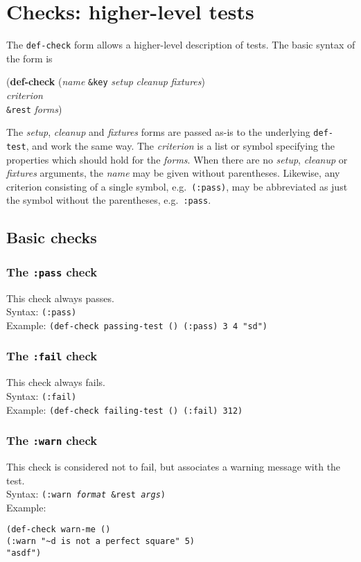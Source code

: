 \documentclass{article}
\begin{document}
\section{Checks: higher-level tests}
The
\texttt{def-check}
form allows a higher-level description of tests.  The basic syntax of
the form is
\begin{tabbing}\hspace*{1cm}
(\textbf{de}\=\textbf{f-}\=\textbf{check} (\textit{name}
	\texttt{\&key} \= \textit{setup}
	     \textit{cleanup} \textit{fixtures})
\\ \>\> \textit{criterion}
\\ \>\texttt{\&rest} \textit{forms})
\end{tabbing}
The \textit{setup}, \textit{cleanup} and \textit{fixtures} forms are
passed as-is to the underlying \texttt{def-test}, and work the same
way.  The \textit{criterion} is a list or symbol specifying the
properties which should hold for the \textit{forms}.  When there are
no \textit{setup}, \textit{cleanup} or \textit{fixtures} arguments,
the \textit{name} may be given without parentheses.  Likewise, any
criterion consisting of a single symbol, e.g.\ \texttt{(:pass)}, may
be abbreviated as just the symbol without the parentheses, e.g.\
\texttt{:pass}.
\subsection{Basic checks}
\subsubsection{The \texttt{:pass} check} 
This check always passes.
\\ Syntax: \texttt{(:pass)}
\\ Example: \texttt{(def-check passing-test () (:pass) 3 4 "sd")}

\subsubsection{The \texttt{:fail} check} 
This check always fails.
\\ Syntax: \texttt{(:fail)}
\\ Example: \texttt{(def-check failing-test () (:fail) 312)}

\subsubsection{The \texttt{:warn} check} 
This check is considered not to fail, but associates a warning message
with the test.\index{warn@\texttt{:warn}}
\\ Syntax: \texttt{(:warn \emph{format} \&rest \emph{args})}
\\ Example:
\begin{tabbing}
\texttt{(de}\=\texttt{f-}\=\texttt{check warn-me ()}
\\ \>\>\texttt{(:warn "\~{}d is not a perfect square" 5)}
\\ \>\texttt{"asdf")}
\end{tabbing}
\end{document}
